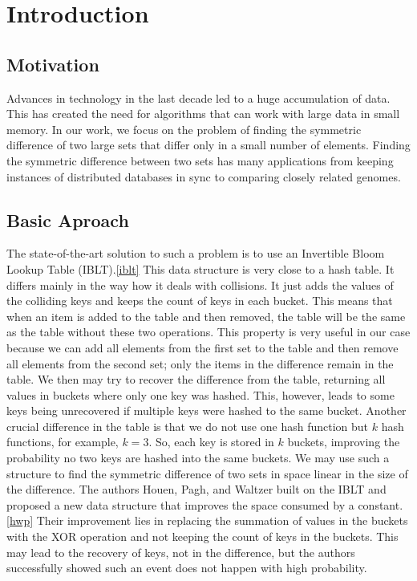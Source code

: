 \chapter*{Introduction}

\section*{Motivation}

Advances in technology in the last decade led to a huge accumulation of data. 
This has created the need for algorithms that can work with large data in small memory. 
In our work, we focus on the problem of finding the symmetric difference of two large sets 
that differ only in a small number of elements. 
Finding the symmetric difference between two sets has many applications 
from keeping instances of distributed databases in sync to comparing closely related genomes.

\section*{Basic Aproach}
The state-of-the-art solution to such a problem is 
to use an Invertible Bloom Lookup Table (IBLT).\ref{iblt} This data structure is very close to a hash table.
It differs mainly in the way how it deals with collisions. It just adds the values of the colliding keys and keeps the count of keys in each bucket.
This means that when an item is added to the table and then removed, the table will be the same as the table without these two operations.
This property is very useful in our case because we can add all elements from the first set to the table and then remove all elements from the second set; only the items in the difference remain in the table. We then may try to recover the difference from the table, returning all values in buckets where only one key was hashed. This, however, leads to some keys being unrecovered if multiple keys were hashed to the same bucket.
Another crucial difference in the table is that we do not use one hash function but $k$ hash functions, for example, $k=3$. So, each key is stored in $k$ buckets, 
improving the probability no two keys are hashed into the same buckets.
We may use such a structure to find the symmetric difference of two sets in space linear in the size of the difference.
The authors Houen, Pagh, and Waltzer built on the IBLT and proposed a new data structure that improves the space consumed by a constant. \cite{doi:10.1137/1.9781611977585.ch21} \ref{hwp}
Their improvement lies in replacing the summation of values in the buckets with the XOR operation and not keeping the count of keys in the buckets.
This may lead to the recovery of keys, not in the difference, but the authors successfully showed such an event does not happen with high probability.


